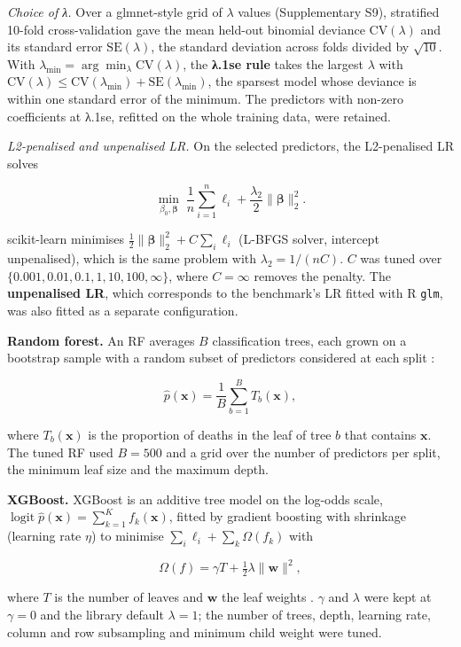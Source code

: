 \emph{Choice of λ.} Over a glmnet-style grid of \(\lambda\) values
(Supplementary S9), stratified 10-fold cross-validation gave the mean held-out
binomial deviance \(\mathrm{CV}(\lambda)\) and its standard error
\(\mathrm{SE}(\lambda)\), the standard deviation across folds divided by
\(\sqrt{10}\). With \(\lambda_{\min} = \arg\min_\lambda \mathrm{CV}(\lambda)\),
the \textbf{λ.1se rule} takes the largest \(\lambda\) with
\(\mathrm{CV}(\lambda) \le \mathrm{CV}(\lambda_{\min}) + \mathrm{SE}(\lambda_{\min})\),
the sparsest model whose deviance is within one standard error of the minimum.
The predictors with non-zero coefficients at λ.1se, refitted on the whole
training data, were retained.

\emph{L2-penalised and unpenalised LR.} On the selected predictors, the
L2-penalised LR solves

\[\min_{\beta_0, \boldsymbol\beta} \; \frac{1}{n}\sum_{i=1}^{n} \ell_i + \frac{\lambda_2}{2}\lVert\boldsymbol\beta\rVert_2^2 .\]

scikit-learn minimises
\(\tfrac{1}{2}\lVert\boldsymbol\beta\rVert_2^2 + C\sum_i \ell_i\) (L-BFGS
solver, intercept unpenalised), which is the same problem with
\(\lambda_2 = 1/(nC)\). \(C\) was tuned over
\(\{0.001, 0.01, 0.1, 1, 10, 100, \infty\}\), where \(C = \infty\) removes the
penalty. The \textbf{unpenalised LR}, which corresponds to the benchmark's LR
fitted with R \texttt{glm}, was also fitted as a separate configuration.

\textbf{Random forest.} An RF averages \(B\) classification trees, each grown on
a bootstrap sample with a random subset of predictors considered at each split
\parencite{breiman2001}:

\[\hat p(\mathbf{x}) = \frac{1}{B}\sum_{b=1}^{B} T_b(\mathbf{x}),\]

where \(T_b(\mathbf{x})\) is the proportion of deaths in the leaf of tree \(b\)
that contains \(\mathbf{x}\). The tuned RF used \(B = 500\) and a grid over the
number of predictors per split, the minimum leaf size and the maximum depth.

\textbf{XGBoost.} XGBoost is an additive tree model on the log-odds scale,
\(\operatorname{logit}\hat p(\mathbf{x}) = \sum_{k=1}^{K} f_k(\mathbf{x})\),
fitted by gradient boosting with shrinkage (learning rate \(\eta\)) to minimise
\(\sum_i \ell_i + \sum_k \Omega(f_k)\) with

\[\Omega(f) = \gamma T + \tfrac{1}{2}\lambda \lVert\mathbf{w}\rVert^2,\]

where \(T\) is the number of leaves and \(\mathbf{w}\) the leaf weights
\parencite{chen2016}. \(\gamma\) and \(\lambda\) were kept at \(\gamma = 0\) and
the library default \(\lambda = 1\); the number of trees, depth, learning rate,
column and row subsampling and minimum child weight were tuned.

